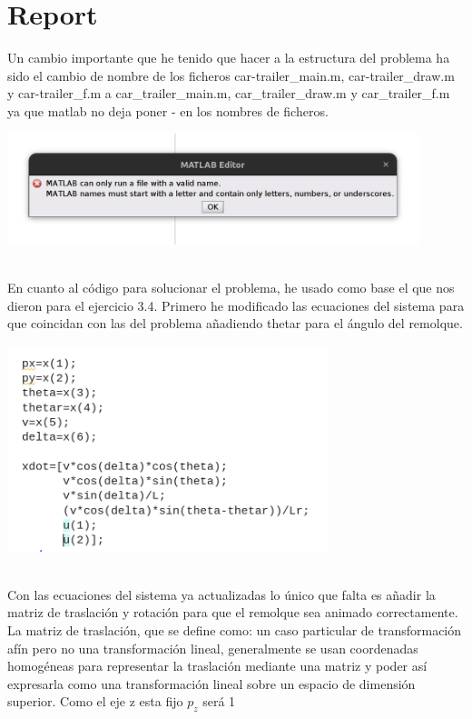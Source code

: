 \documentclass{article}
\begin{document}
\section*{Report}
Un cambio importante que he tenido que hacer a la estructura del problema ha sido el cambio de nombre de los ficheros car-trailer\_main.m, car-trailer\_draw.m y car-trailer\_f.m a car\_trailer\_main.m, car\_trailer\_draw.m y car\_trailer\_f.m ya que matlab no deja poner - en los nombres de ficheros.\\
\centerline{\includegraphics*[width=0.9\textwidth]{figures/matlab_error}}\\
\newline
En cuanto al código para solucionar el problema, he usado como base el que nos dieron para el ejercicio 3.4. Primero he modificado las ecuaciones del sistema para que coincidan con las del problema añadiendo thetar para el ángulo del remolque.\\
\centerline{\includegraphics*[width=0.7\textwidth]{figures/matlab_state}}\\
\newline
Con las ecuaciones del sistema ya actualizadas lo único que falta es añadir la matriz de traslación y rotación para que el remolque sea animado correctamente.\\
\newline
La matriz de traslación, que se define como: un caso particular de transformación afín pero no una transformación lineal, generalmente se usan coordenadas homogéneas para representar la traslación mediante una matriz y poder así expresarla como una transformación lineal sobre un espacio de dimensión superior. Como el eje z esta fijo $p_z$ será 1\\
\end{document}
